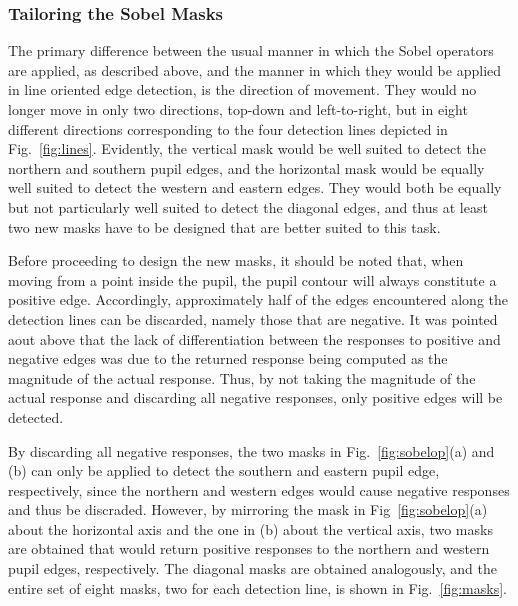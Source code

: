 
\subsubsection{Tailoring the Sobel Masks}

The primary difference between the usual manner in which the Sobel
operators are applied, as described above, and the manner in which
they would be applied in line oriented edge detection, is the
direction of movement.  They would no longer move in only two
directions, top-down and left-to-right, but in eight different
directions corresponding to the four detection lines depicted in
Fig.~\ref{fig:lines}.  Evidently, the vertical mask would be well
suited to detect the northern and southern pupil edges, and the
horizontal mask would be equally well suited to detect the western and
eastern edges.  They would both be equally but not particularly well
suited to detect the diagonal edges, and thus at least two new masks
have to be designed that are better suited to this task.

Before proceeding to design the new masks, it should be noted that,
when moving from a point inside the pupil, the pupil contour will
always constitute a positive edge.  Accordingly, approximately half of
the edges encountered along the detection lines can be discarded,
namely those that are negative.  It was pointed aout above that the
lack of differentiation between the responses to positive and negative
edges was due to the returned response being computed as the magnitude
of the actual response.  Thus, by not taking the magnitude of the
actual response and discarding all negative responses, only positive
edges will be detected.

By discarding all negative responses, the two masks in
Fig.~\ref{fig:sobelop}(a) and (b) can only be applied to detect the
southern and eastern pupil edge, respectively, since the northern and
western edges would cause negative responses and thus be discraded.
However, by mirroring the mask in Fig~\ref{fig:sobelop}(a) about the
horizontal axis and the one in (b) about the vertical axis, two masks
are obtained that would return positive responses to the northern and
western pupil edges, respectively.  The diagonal masks are obtained
analogously, and the entire set of eight masks, two for each detection
line, is shown in Fig.~\ref{fig:masks}.

